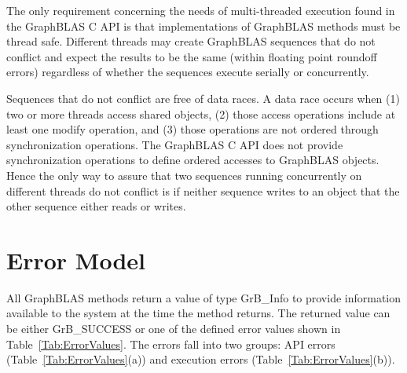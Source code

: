 The only requirement concerning the needs of multi-threaded execution found in the GraphBLAS C API
is that implementations of GraphBLAS methods must be thread safe.  Different threads 
may create GraphBLAS sequences that do not conflict and expect the results to be the 
same (within floating point roundoff errors) regardless of whether the sequences execute serially or concurrently.

Sequences that do not conflict are free of data races.  A data race occurs
when (1) two or more threads access shared objects, (2) those access 
operations include at least one modify operation,
and (3) those operations are not ordered through synchronization operations.   
The GraphBLAS C API does not provide synchronization operations to define 
ordered accesses to GraphBLAS objects. Hence the only way to assure that 
two sequences running concurrently on different threads do not 
conflict is if neither sequence writes to an object that the other 
sequence either reads or writes.


\section{Error Model}
\label{Sec:ErrorModel}

All GraphBLAS methods return a value of type {\sf GrB\_Info} to provide
information available to the system at the time the method returns. The
returned value can be either {\sf GrB\_SUCCESS} or one of the defined
error values shown in Table~\ref{Tab:ErrorValues}. The errors fall into
two groups: API errors (Table~\ref{Tab:ErrorValues}(a)) and execution
errors (Table~\ref{Tab:ErrorValues}(b)).

